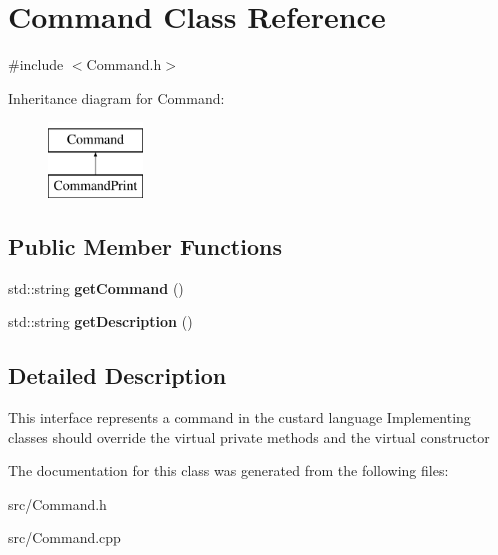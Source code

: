 \hypertarget{class_command}{
\section{\-Command \-Class \-Reference}
\label{class_command}
}


{\ttfamily \#include $<$\-Command.\-h$>$}

\-Inheritance diagram for \-Command\-:\begin{figure}[H]
\begin{center}
\leavevmode
\includegraphics[height=2.000000cm]{class_command}
\end{center}
\end{figure}
\subsection*{\-Public \-Member \-Functions}
\begin{DoxyCompactItemize}
\item 
\hypertarget{class_command_a424b1c5853432a0b95f85a2c2dc85832}{
std\-::string {\bfseries get\-Command} ()}
\label{class_command_a424b1c5853432a0b95f85a2c2dc85832}

\item 
\hypertarget{class_command_a782700e60fb0883895d6157149ab2021}{
std\-::string {\bfseries get\-Description} ()}
\label{class_command_a782700e60fb0883895d6157149ab2021}

\end{DoxyCompactItemize}


\subsection{\-Detailed \-Description}
\-This interface represents a command in the custard language \-Implementing classes should override the virtual private methods and the virtual constructor 

\-The documentation for this class was generated from the following files\-:\begin{DoxyCompactItemize}
\item 
src/\-Command.\-h\item 
src/\-Command.\-cpp\end{DoxyCompactItemize}
